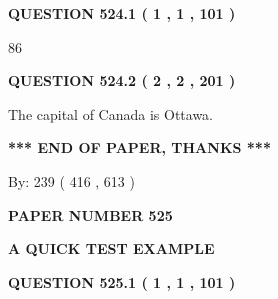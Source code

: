 \documentclass[12pt]{article}
\begin{document}
{\textbf{\Large{QUESTION
524.1 
 ( 1 , 1 , 101 )
}}}
  
  
 
 
\noindent{}

86
 
 
  
\vspace{0.2in}
  
{\textbf{\Large{QUESTION
524.2 
 ( 2 , 2 , 201 )
}}}
  
  
 
 
\noindent{}
 
 
The capital of Canada is Ottawa.
 
 
 
 
   
   
 \vspace{0.2in}
 
   
   
   
   
\vspace{1.0in} 
{\textbf{\large{ *** END OF PAPER, THANKS *** }}} 
   
   
\hspace{1.0in} By: 
 239 ( 416 ,  613 )
   
   
   
   
\newpage 
\setcounter{page}{ 
   525001 } 
   
   
   
   
 {\textbf{ \Large{ PAPER NUMBER  525  }}}
   
   
\vspace{0.2in}
   
   
   
   
   
   
 \vspace{0.2in}
{\LARGE {\textbf{ A QUICK TEST EXAMPLE}}}
   
   
  
\vspace{0.2in}
  
{\textbf{\Large{QUESTION
525.1 
 ( 1 , 1 , 101 )
}}}
  
  
 
 
\noindent{}
\end{document}
